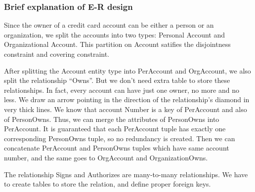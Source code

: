 \documentclass[11pt]{article}
\begin{document}
\subsubsection{Brief explanation of E-R design}
\label{sec:E-R design}

\par
Since the owner of a credit card account can be either a person or an organization, we split the accounts into two types: Personal Account and Organizational Account. This partition on Account satifies the disjointness constraint and covering constraint.

\par
After splitting the Account entity type into PerAccount and OrgAccount, we also split the relationship ``Owns''. But we don't need extra table to store these relationships. In fact, every account can have just one owner, no more and no less. We draw an arrow pointing in the direction of the relationship's diamond in very thick lines. We know that account Number is a key of PerAccount and also of PersonOwns. Thus, we can merge the attributes of PersonOwns into PerAccount. It is guaranteed that each PerAccount tuple has exactly one corresponding PersonOwns tuple, so no redundancy is created. Then we can concatenate PerAccount and PersonOwns tuples which have same account number, and the same goes to OrgAccount and OrganizationOwns.

\par
The relationship Signs and Authorizes are many-to-many relationships. We have to create tables to store the relation, and define proper foreign keys.
\end{document}

